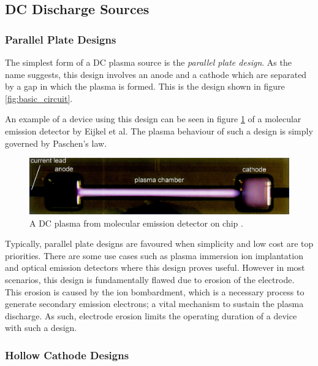 \subsection{DC Discharge Sources}
\subsubsection{Parallel Plate Designs}

The simplest form of a DC plasma source is the \textit{parallel plate design}. As the name suggests, this design involves an anode and a cathode which are separated by a gap in which the plasma is formed. This is the design shown in figure \ref{fig:basic_circuit}.

An example of a device using this design can be seen in figure \ref{fig:parallel_plate_design} of a molecular emission detector by Eijkel et al\cite{Eijkel1999}. The plasma behaviour of such a design is simply governed by Paschen's law. 

\begin{figure}[h!]
	\centering
	\includegraphics[width=\linewidth]{chapter_2/figures/parallel_plate.jpeg}
	\caption{A DC plasma from molecular emission detector on chip \cite{Eijkel1999}.}
	\label{fig:parallel_plate_design}
\end{figure}

Typically, parallel plate designs are favoured when simplicity and low cost are top priorities. There are some use cases such as plasma immersion ion implantation \cite{Ueda1999} and optical emission detectors \cite{Eijkel1999} where this design proves useful. However in most scenarios, this design is fundamentally flawed due to erosion of the electrode. This erosion is caused by the ion bombardment, which is a necessary process to generate secondary emission electrons; a vital mechanism to sustain the plasma discharge. As such, electrode erosion limits the operating duration of a device with such a design.   

\subsubsection{Hollow Cathode Designs}

